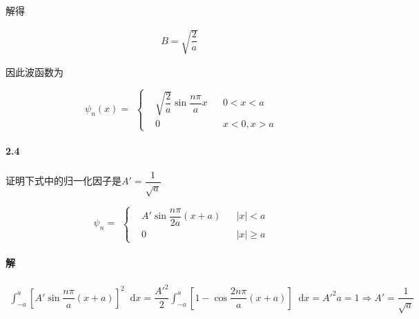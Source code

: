 \documentclass{article}
\newcommand*{\md}{\mathop{}\!\mathrm{d}}
\begin{document}
解得

\begin{equation*}
  \begin{aligned}
    B = \sqrt{\dfrac{2}{a} } 
  \end{aligned}
\end{equation*}

因此波函数为

\begin{equation*}
  \begin{aligned}
    \psi_n \left( x \right) = 
  \end{aligned}
  \left\{
  \begin{aligned}
    & \sqrt{\dfrac{2}{a}  } \sin \dfrac{n \pi}{a}x && 0< x < a \\
    & 0 && x<0,x>a
  \end{aligned}
  \right.
\end{equation*}






\paragraph{2.4}

证明下式中的归一化因子是$A'=\dfrac{1}{\sqrt{a}} $

\begin{equation*}
  \begin{aligned}
    \psi_n =
  \end{aligned}
  \left\{
  \begin{aligned}
    & A' \sin \dfrac{n\pi}{2a} \left( x + a \right) && \left| x \right| < a \\
    & 0 && \left| x \right| \geq a
  \end{aligned}
  \right.
\end{equation*}

\paragraph{解}

\begin{equation*}
  \begin{aligned}
    \int_{-a}^a \left[ A' \sin \dfrac{n\pi}{a} \left( x + a \right)  \right]^2 \md x
    = \dfrac{A'^2}{2} \int_{-a}^a \left[ 1 - \cos \dfrac{2n\pi}{a} \left( x +a \right)  \right] \md x
    = A'^2 a = 1
    \Rightarrow
    A' = \dfrac{1}{\sqrt{a}} 
  \end{aligned}
\end{equation*}
\end{document}
